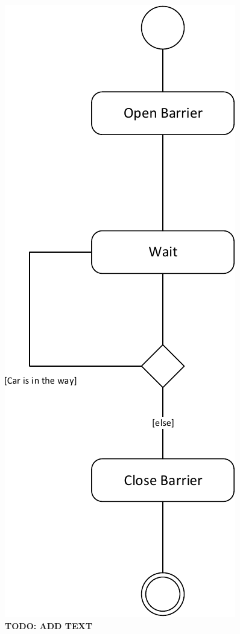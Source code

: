 \begin{figure}
\centerline{\includegraphics[width=\textwidth]{img/activity_diagrams/Pass_barrier}}
\caption{\textbf{TODO: ADD TEXT}}
\label{fig:activity_pb}
\end{figure}


